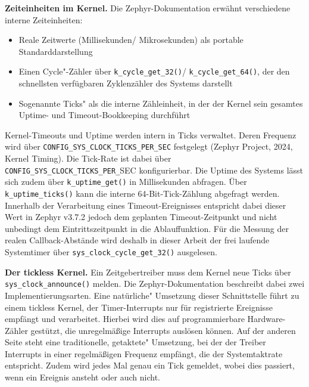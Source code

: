 \textbf{Zeiteinheiten im Kernel.} Die Zephyr-Dokumentation erw{\"a}hnt verschiedene interne Zeiteinheiten:

\begin{itemize}
\item Reale Zeitwerte (Millisekunden/ Mikrosekunden) als portable Standarddarstellung
\item Einen \glqq{}Cycle"-Z{\"a}hler {\"u}ber \lstinline[style=fileinline]|k_cycle_get_32()|/ \lstinline[style=fileinline]|k_cycle_get_64()|, der den schnellsten verf{\"u}gbaren Zyklenz{\"a}hler des Systems darstellt
\item Sogenannte \glqq{}Ticks" als die interne Z{\"a}hleinheit, in der der Kernel sein gesamtes Uptime- und Timeout-Bookkeeping durchf{\"u}hrt
\end{itemize}
Kernel-Timeouts und Uptime werden intern in Ticks verwaltet. Deren Frequenz wird {\"u}ber \lstinline[style=fileinline]|CONFIG_SYS_CLOCK_TICKS_PER_SEC| festgelegt (Zephyr Project, 2024, \glqq{}Kernel Timing\grqq{}). Die Tick-Rate ist dabei {\"u}ber \lstinline[style=fileinline]|CONFIG_SYS_CLOCK_TICKS_PER_|SEC konfigurierbar. Die Uptime des Systems l{\"a}sst sich zudem {\"u}ber \lstinline[style=fileinline]|k_uptime_get()| in Millisekunden abfragen. {\"U}ber \lstinline[style=fileinline]|k_uptime_ticks()| kann die interne 64-Bit-Tick-Z{\"a}hlung abgefragt werden. Innerhalb der Verarbeitung eines Timeout-Ereignisses entspricht dabei dieser Wert in Zephyr v3.7.2 jedoch dem geplanten Timeout-Zeitpunkt und nicht unbedingt dem Eintrittszeitpunkt in die Ablauffunktion. F{\"u}r die Messung der realen Callback-Abst{\"a}nde wird deshalb in dieser Arbeit der frei laufende Systemtimer {\"u}ber \lstinline[style=fileinline]|sys_clock_cycle_get_32()| ausgelesen.

\textbf{Der tickless Kernel.} Ein Zeitgebertreiber muss dem Kernel neue Ticks {\"u}ber \lstinline[style=fileinline]|sys_clock_announce()| melden. Die Zephyr-Dokumentation beschreibt dabei zwei Implementierungsarten. Eine \glqq{}nat{\"u}rliche" Umsetzung dieser Schnittstelle f{\"u}hrt zu einem \glqq{}tickless\grqq{} Kernel, der Timer-Interrupts nur f{\"u}r registrierte Ereignisse empf{\"a}ngt und verarbeitet. Hierbei wird dies auf programmierbare Hardware-Z{\"a}hler gest{\"u}tzt, die unregelm{\"a}{\ss}ige Interrupts ausl{\"o}sen k{\"o}nnen. Auf der anderen Seite steht eine traditionelle, \glqq{}getaktete" Umsetzung, bei der der Treiber Interrupts in einer regelm{\"a}{\ss}igen Frequenz empf{\"a}ngt, die der Systemtaktrate entspricht. Zudem wird jedes Mal genau ein Tick gemeldet, wobei dies passiert, wenn ein Ereignis ansteht oder auch nicht.

